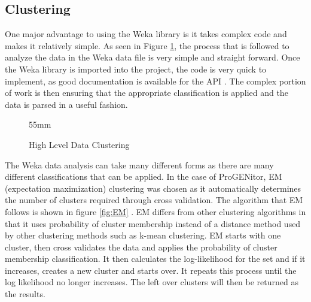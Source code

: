 \subsection{Clustering}
One major advantage to using the Weka library is it takes complex code and makes
it relatively simple.  As seen in Figure \ref{fig:clustering}, the process that is
followed to analyze the data in the Weka data file is very simple and straight
forward.  Once the Weka library is imported into the project, the code is very
quick to implement, as good documentation is available for the API \cite{weka}.  The
complex portion of work is then ensuring that the appropriate classification is
applied and the data is parsed in a useful fashion.


\usetikzlibrary{shapes,arrows,chains}

\begin{figure}[H]
	\centering
	\resizebox {!} {55mm} {
}
	\caption{High Level Data Clustering}
	\label{fig:clustering}
\end{figure}

The Weka data analysis can take many different forms as there are many different
classifications that can be applied.  In the case of ProGENitor, EM (expectation
maximization) clustering was chosen as it automatically determines the number of
clusters required through cross validation.  The algorithm that EM follows is
shown in figure \ref{fig:EM} \cite{EM}.  EM differs from other clustering
algorithms in that it uses probability of cluster membership instead of a
distance method used by other clustering methods such as k-mean clustering.  EM
starts with one cluster, then cross validates the data and applies the
probability of cluster membership classification.  It then calculates the
log-likelihood for the set and if it increases, creates a new cluster and starts
over.  It repeats this process until the log likelihood no longer increases. 
The left over clusters will then be returned as the results.

